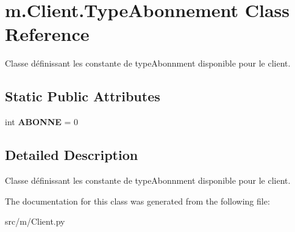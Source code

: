 \hypertarget{classm_1_1_client_1_1_type_abonnement}{}\section{m.\+Client.\+Type\+Abonnement Class Reference}
\label{classm_1_1_client_1_1_type_abonnement}


Classe définissant les constante de type\+Abonnment disponible pour le client.  


\subsection*{Static Public Attributes}
\begin{DoxyCompactItemize}
\item 
\hypertarget{classm_1_1_client_1_1_type_abonnement_a8bc2b1d1e62d726dfabd6552aa8a8b75}{}int {\bfseries A\+B\+O\+N\+N\+E} = 0\label{classm_1_1_client_1_1_type_abonnement_a8bc2b1d1e62d726dfabd6552aa8a8b75}

\end{DoxyCompactItemize}


\subsection{Detailed Description}
Classe définissant les constante de type\+Abonnment disponible pour le client. 

The documentation for this class was generated from the following file\+:\begin{DoxyCompactItemize}
\item 
src/m/Client.\+py\end{DoxyCompactItemize}

